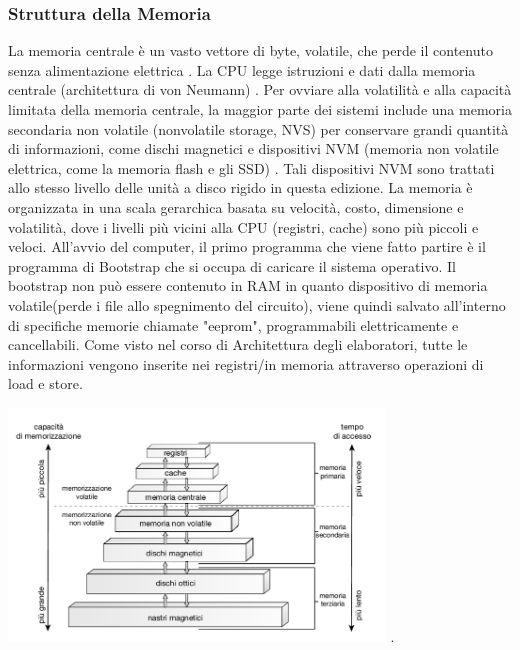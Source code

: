 \documentclass[12pt,a4paper, openany]{book}
\begin{document}
\begin{small}
		\subsubsection{Struttura della Memoria} La memoria centrale è un vasto vettore di byte, volatile, che perde il contenuto senza alimentazione elettrica
		. La CPU legge istruzioni e dati dalla memoria centrale (architettura di von Neumann)
		.\newline
		Per ovviare alla volatilità e alla capacità limitata della memoria centrale, la maggior parte dei sistemi include una memoria secondaria non volatile (nonvolatile storage, NVS) per conservare grandi quantità di informazioni, come dischi magnetici e dispositivi NVM (memoria non volatile elettrica, come la memoria flash e gli SSD)\newline
		. Tali dispositivi NVM sono trattati allo stesso livello delle unità a disco rigido in questa edizione.	 La memoria è organizzata in una scala gerarchica basata su velocità, costo, dimensione e volatilità, dove i livelli più vicini alla CPU (registri, cache) sono più piccoli e veloci.
		\newline
		All'avvio del computer, il primo programma che viene fatto partire è il programma di Bootstrap che si occupa di caricare il sistema operativo. Il bootstrap non può essere contenuto in RAM in quanto dispositivo di memoria volatile(perde i file allo spegnimento del circuito), viene quindi salvato all'interno di specifiche memorie chiamate "eeprom", programmabili elettricamente e cancellabili. 
		Come visto nel corso di Architettura degli elaboratori, tutte le informazioni vengono inserite nei registri/in memoria attraverso operazioni di load e store.
		
		\includegraphics[width=10cm, center]{img/1.1.2.4}
		.

\end{small}
\end{document}
